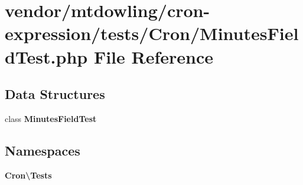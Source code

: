 \section{vendor/mtdowling/cron-\/expression/tests/\+Cron/\+Minutes\+Field\+Test.php File Reference}
\label{_minutes_field_test_8php}
\subsection*{Data Structures}
\begin{DoxyCompactItemize}
\item 
class {\bf Minutes\+Field\+Test}
\end{DoxyCompactItemize}
\subsection*{Namespaces}
\begin{DoxyCompactItemize}
\item 
 {\bf Cron\textbackslash{}\+Tests}
\end{DoxyCompactItemize}
